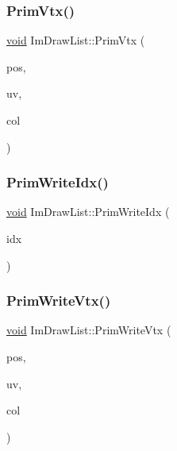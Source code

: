 \mbox{\label{structImDrawList_a405377158f0028ad8b4fb6509eef4532}} 
\subsubsection{\texorpdfstring{Prim\+Vtx()}{PrimVtx()}}
{\footnotesize\ttfamily \hyperlink{imgui__impl__opengl3__loader_8h_ac668e7cffd9e2e9cfee428b9b2f34fa7}{void} Im\+Draw\+List\+::\+Prim\+Vtx (\begin{DoxyParamCaption}\item[{const \hyperlink{structImVec2}{Im\+Vec2} \&}]{pos,  }\item[{const \hyperlink{structImVec2}{Im\+Vec2} \&}]{uv,  }\item[{Im\+U32}]{col }\end{DoxyParamCaption})\hspace{0.3cm}{\ttfamily [inline]}}

\mbox{\label{structImDrawList_a42b72f87a0084c02f11dcd1560c8bbc7}} 
\subsubsection{\texorpdfstring{Prim\+Write\+Idx()}{PrimWriteIdx()}}
{\footnotesize\ttfamily \hyperlink{imgui__impl__opengl3__loader_8h_ac668e7cffd9e2e9cfee428b9b2f34fa7}{void} Im\+Draw\+List\+::\+Prim\+Write\+Idx (\begin{DoxyParamCaption}\item[{Im\+Draw\+Idx}]{idx }\end{DoxyParamCaption})\hspace{0.3cm}{\ttfamily [inline]}}

\mbox{\label{structImDrawList_af86de4faf6c8e978fb712ea14c5d0c5f}} 
\subsubsection{\texorpdfstring{Prim\+Write\+Vtx()}{PrimWriteVtx()}}
{\footnotesize\ttfamily \hyperlink{imgui__impl__opengl3__loader_8h_ac668e7cffd9e2e9cfee428b9b2f34fa7}{void} Im\+Draw\+List\+::\+Prim\+Write\+Vtx (\begin{DoxyParamCaption}\item[{const \hyperlink{structImVec2}{Im\+Vec2} \&}]{pos,  }\item[{const \hyperlink{structImVec2}{Im\+Vec2} \&}]{uv,  }\item[{Im\+U32}]{col }\end{DoxyParamCaption})\hspace{0.3cm}{\ttfamily [inline]}}

